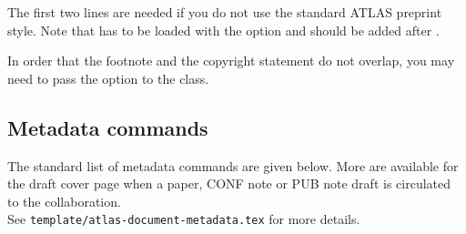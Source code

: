  The first two lines are needed if you do not use the standard ATLAS preprint style.
Note that  has to be loaded with the option 
and  should be added after \verb||.

 In order that the footnote and the copyright statement do not overlap,
you may need to pass the option  to the  class.


\subsection{Metadata commands}

The standard list of metadata commands are given below.
More are available for the draft cover page when a paper, CONF note or PUB note draft
is circulated to the collaboration.\\
See \texttt{template/atlas-document-metadata.tex} for more details.

